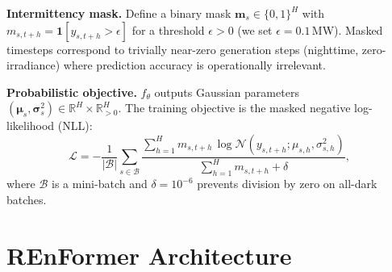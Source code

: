 \documentclass[10pt,twocolumn]{article}
\begin{document}
\textbf{Intermittency mask.}
Define a binary mask $\mathbf{m}_s \in \{0,1\}^H$ with
$m_{s,t+h} = \mathbf{1}[y_{s,t+h} > \epsilon]$
for a threshold $\epsilon > 0$ (we set $\epsilon = 0.1$\,MW). Masked
timesteps correspond to trivially near-zero generation steps (nighttime,
zero-irradiance) where prediction accuracy is operationally irrelevant.

\textbf{Probabilistic objective.}
$f_\theta$ outputs Gaussian parameters $(\boldsymbol{\mu}_s,
\boldsymbol{\sigma}_s^2) \in \mathbb{R}^H \times \mathbb{R}^H_{>0}$.
The training objective is the masked negative log-likelihood (NLL):
\begin{equation}
  \mathcal{L} = -\frac{1}{|\mathcal{B}|} \sum_{s \in \mathcal{B}}
  \frac{\sum_{h=1}^{H} m_{s,t+h}\, \log \mathcal{N}(y_{s,t+h};
    \mu_{s,h}, \sigma_{s,h}^2)}{\sum_{h=1}^{H} m_{s,t+h} + \delta},
  \label{eq:masked_nll}
\end{equation}
where $\mathcal{B}$ is a mini-batch and $\delta = 10^{-6}$ prevents
division by zero on all-dark batches.

\section{REnFormer Architecture}
\end{document}
